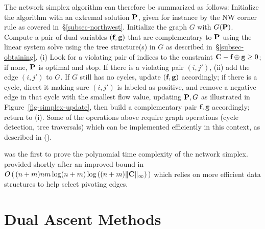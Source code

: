 The network simplex algorithm can therefore be summarized as follows: Initialize the algorithm with an extremal solution $\P$, given for instance by the NW corner rule as covered in~\S\ref{subsec-northwest}. Initialize the graph $G$ with $G(\P)$. Compute a pair of dual variables $(\fD,\gD)$ that are complementary to $\P$ using the linear system solve using the tree structure(s) in $G$ as described in~\S\ref{subsec-obtaining}. {(i)} Look for a violating pair of indices to the constraint $\C- \fD\oplus \gD\geq 0$; if none, $\P$ is optimal and stop. If there is a violating pair $(i,j')$, {(ii)} add the edge $(i,j')$ to $G$. If $G$ still has no cycles, update $(\fD,\gD)$ accordingly; if there is a cycle, direct it making sure $(i,j')$ is labeled as positive, and remove a negative edge in that cycle with the smallest flow value, updating $\P,G$ as illustrated in Figure~\ref{fig-simplex-update}, then build a complementary pair $\fD,\gD$ accordingly; return to {(i)}. Some of the operations above require graph operations (cycle detection, tree traversals) which can be implemented efficiently in this context, as described in (\cite[\S5]{bertsekas1998network}).

\citet{Orlin1997} was the first to prove the polynomial time complexity of the network simplex.~\citet{Tarjan1997} provided shortly after an improved bound in $O\left(\,(n+m)nm \log(n+m)\log\left((n+m)\|\C\|_\infty\right)\,\right)$ which relies on more efficient data structures to help select pivoting edges.




\section{Dual Ascent Methods}\label{s-dual-ascent}

